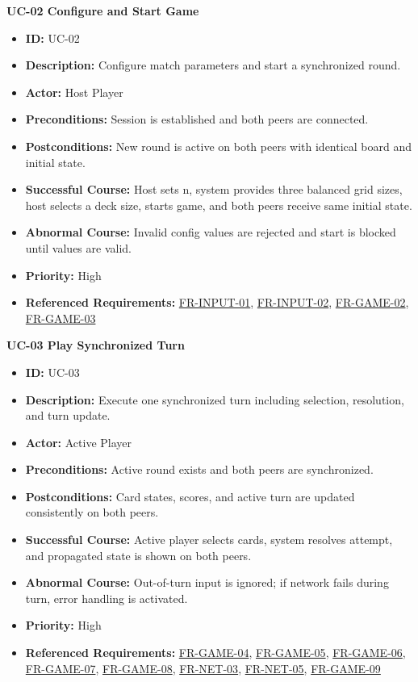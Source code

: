 \documentclass[a4paper,12pt]{article}
\newcommand{\reqref}[1]{\hyperlink{req:#1}{#1}}
\begin{document}
    \textbf{UC-02 Configure and Start Game}
    \begin{itemize}[itemsep=0pt,topsep=0pt,parsep=0pt,partopsep=0pt]
        \item \textbf{ID:} UC-02
        \item \textbf{Description:} Configure match parameters and start a synchronized round.
        \item \textbf{Actor:} Host Player
        \item \textbf{Preconditions:} Session is established and both peers are connected.
        \item \textbf{Postconditions:} New round is active on both peers with identical board and initial state.
        \item \textbf{Successful Course:} Host sets n, system provides three balanced grid sizes, host selects a deck size, starts game, and both peers receive same initial state.
        \item \textbf{Abnormal Course:} Invalid config values are rejected and start is blocked until values are valid.
        \item \textbf{Priority:} High
        \item \textbf{Referenced Requirements:} \reqref{FR-INPUT-01}, \reqref{FR-INPUT-02}, \reqref{FR-GAME-02}, \reqref{FR-GAME-03}
    \end{itemize}

    \textbf{UC-03 Play Synchronized Turn}
    \begin{itemize}[itemsep=0pt,topsep=0pt,parsep=0pt,partopsep=0pt]
        \item \textbf{ID:} UC-03
        \item \textbf{Description:} Execute one synchronized turn including selection, resolution, and turn update.
        \item \textbf{Actor:} Active Player
        \item \textbf{Preconditions:} Active round exists and both peers are synchronized.
        \item \textbf{Postconditions:} Card states, scores, and active turn are updated consistently on both peers.
        \item \textbf{Successful Course:} Active player selects cards, system resolves attempt, and propagated state is shown on both peers.
        \item \textbf{Abnormal Course:} Out-of-turn input is ignored; if network fails during turn, error handling is activated.
        \item \textbf{Priority:} High
        \item \textbf{Referenced Requirements:} \reqref{FR-GAME-04}, \reqref{FR-GAME-05}, \reqref{FR-GAME-06}, \reqref{FR-GAME-07}, \reqref{FR-GAME-08}, \reqref{FR-NET-03}, \reqref{FR-NET-05}, \reqref{FR-GAME-09}
    \end{itemize}
\end{document}
